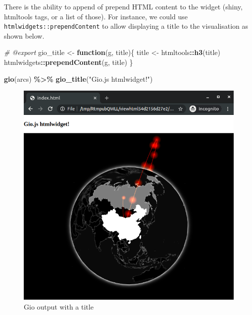 \documentclass[
]{krantz}
\makeatletter
\newenvironment{Shaded}{\begin{snugshade}}{\end{snugshade}}
\newcommand{\CommentTok}[1]{\textcolor[rgb]{0.37,0.37,0.37}{\textit{#1}}}
\newcommand{\ControlFlowTok}[1]{\textcolor[rgb]{0.27,0.27,0.27}{\textbf{#1}}}
\newcommand{\KeywordTok}[1]{\textcolor[rgb]{0.27,0.27,0.27}{\textbf{#1}}}
\newcommand{\NormalTok}[1]{#1}
\newcommand{\OperatorTok}[1]{\textcolor[rgb]{0.43,0.43,0.43}{\textbf{#1}}}
\newcommand{\StringTok}[1]{\textcolor[rgb]{0.5,0.5,0.5}{#1}}
\newenvironment{kframe}{%
\medskip{}
\setlength{\fboxsep}{.8em}
 \def\at@end@of@kframe{}%
 \ifinner\ifhmode%
  \def\at@end@of@kframe{\end{minipage}}%
  \begin{minipage}{\columnwidth}%
 \fi\fi%
 \def\FrameCommand##1{\hskip\@totalleftmargin \hskip-\fboxsep
 \colorbox{shadecolor}{##1}\hskip-\fboxsep
     \hskip-\linewidth \hskip-\@totalleftmargin \hskip\columnwidth}%
 \MakeFramed {\advance\hsize-\width
   \@totalleftmargin\z@ \linewidth\hsize
   \@setminipage}}%
 {\par\unskip\endMakeFramed%
 \at@end@of@kframe}
\renewenvironment{Shaded}{\begin{kframe}}{\end{kframe}}
\makeatother
\begin{document}
There is the ability to append of prepend HTML content to the widget (shiny, htmltools tags, or a list of those). For instance, we could use \texttt{htmlwidgets::prependContent} to allow displaying a title to the visualisation as shown below.

\begin{Shaded}
\begin{Highlighting}[]
\CommentTok{\#\textquotesingle{} @export}
\NormalTok{gio\_title <{-}}\StringTok{ }\ControlFlowTok{function}\NormalTok{(g, title)\{}
\NormalTok{  title <{-}}\StringTok{ }\NormalTok{htmltools}\OperatorTok{::}\KeywordTok{h3}\NormalTok{(title)}
\NormalTok{  htmlwidgets}\OperatorTok{::}\KeywordTok{prependContent}\NormalTok{(g, title)}
\NormalTok{\}}
\end{Highlighting}
\end{Shaded}

\begin{Shaded}
\begin{Highlighting}[]
\KeywordTok{gio}\NormalTok{(arcs) }\OperatorTok{\%>\%}\StringTok{ }
\StringTok{  }\KeywordTok{gio\_title}\NormalTok{(}\StringTok{"Gio.js htmlwidget!"}\NormalTok{)}
\end{Highlighting}
\end{Shaded}

\begin{figure}
\centering
\includegraphics{images/gio-title.png}
\caption{Gio output with a title}
\end{figure}
\end{document}
